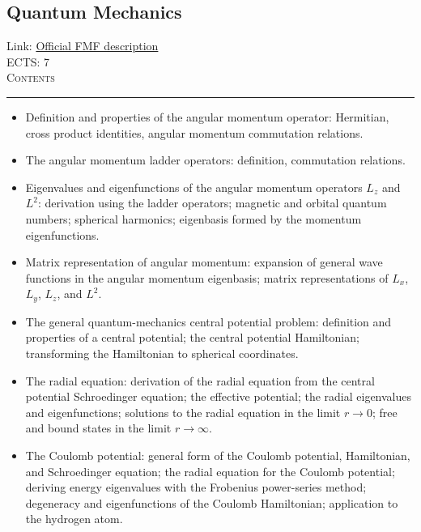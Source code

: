 \documentclass[11pt, a4paper]{article}
\newenvironment{course}[3]{
\subsection{#1}%
Link: \href{#2}{Official FMF description}\\%
ECTS: #3%
\vspace{1ex}
\\
{\large \textsc{Contents}}\\[-0.9ex]%
\rule{\textwidth}{0.5pt}
\vspace{-3ex}
}
{}
\newenvironment{chapter}[1]{
\begin{tcolorbox}[title=#1, breakable]
}
{\end{tcolorbox}}
\begin{document}
\begin{course}{Quantum Mechanics}{https://www.fmf.uni-lj.si/en/study-physics/programmes/1fiz/2020/7000777/courses/1156/}{7}
\begin{chapter}{Symmetries}
\begin{itemize}
        \end{itemize}
    \end{chapter}

    \begin{chapter}{Angular momentum}
        \begin{itemize}
        
            \item Definition and properties of the angular momentum operator: Hermitian, cross product identities, angular momentum commutation relations.

            \item The angular momentum ladder operators: definition, commutation relations.

            \item Eigenvalues and eigenfunctions of the angular momentum operators $ L_{z} $ and $ L^{2} $: derivation using the ladder operators; magnetic and orbital quantum numbers; spherical harmonics; eigenbasis formed by the momentum eigenfunctions.

            \item Matrix representation of angular momentum: expansion of general wave functions in the angular momentum eigenbasis; matrix representations of $ L_{x} $, $ L_{y} $, $ L_{z} $, and $ L^{2} $.
        
        \end{itemize}
    \end{chapter}

    \begin{chapter}{The central potential}
        \begin{itemize}

            \item The general quantum-mechanics central potential problem: definition and properties of a central potential; the central potential Hamiltonian; transforming the Hamiltonian to spherical coordinates.

            \item The radial equation: derivation of the radial equation from the central potential Schroedinger equation; the effective potential; the radial eigenvalues and eigenfunctions; solutions to the radial equation in the limit $ r \to 0 $; free and bound states in the limit $ r \to \infty $.

            \item The Coulomb potential: general form of the Coulomb potential, Hamiltonian, and Schroedinger equation; the radial equation for the Coulomb potential; deriving energy eigenvalues with the Frobenius power-series method; degeneracy and eigenfunctions of the Coulomb Hamiltonian; application to the hydrogen atom.


\end{itemize}
\end{chapter}
\end{course}
\end{document}
